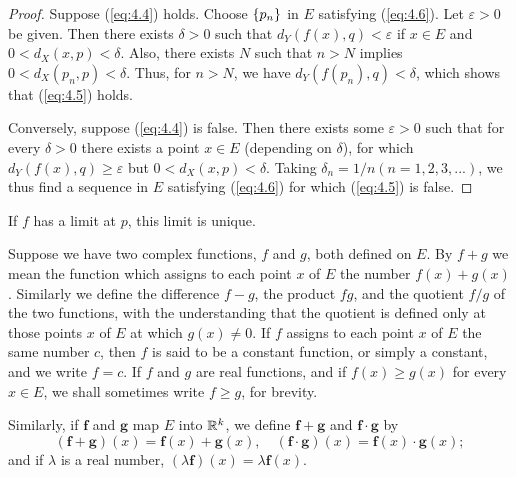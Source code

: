 \begin{proof}
    Suppose (\ref{eq:4.4}) holds. Choose $\protect\{p_n\}$ in $E$ satisfying (\ref{eq:4.6}). Let $\varepsilon > 0$ be given. Then there exists $\delta > 0$ such that $d_Y(f(x), q) < \varepsilon$ if $x \in E$ and $0 < d_X (x, p) < \delta$. Also, there exists $N$ such that $n > N$ implies $0 < d_X(p_n ,p) < \delta$. Thus, for $n > N$, we have $d_Y(f(p_n), q) < \delta$, which shows that (\ref{eq:4.5}) holds. 
    
    Conversely, suppose (\ref{eq:4.4}) is false. Then there exists some $\varepsilon > 0$ such that for every $\delta > 0$ there exists a point $x \in E$ (depending on $\delta$), for which $d_Y(f(x), q) \geq \varepsilon$ but $0 < d_X(x, p) < \delta$. Taking $\delta_n = 1/n (n = 1, 2, 3, ... )$, we thus find a sequence in $E$ satisfying (\ref{eq:4.6}) for which (\ref{eq:4.5}) is false.
\end{proof}

\begin{myCorollary}
    If $f$ has a limit at $p$, this limit is unique.
\end{myCorollary}

\begin{myDef}
    \label{myDef:4.3}
    Suppose we have two complex functions, $f$ and $g$, both defined on $E$. By $f + g$ we mean the function which assigns to each point $x$ of $E$ the number $f(x) + g(x)$. 
    Similarly we define the difference $f - g$, 
    the product $fg$, 
    and the quotient $f/g$ of the two functions, 
    with the understanding that the quotient is defined only at those points $x$ of $E$ at which $g(x) \neq 0$. 
    If $f$ assigns to each point $x$ of $E$ the same number $c$, 
    then $f$ is said to be a constant function, or simply a constant, 
    and we write $f = c$. 
    If $f$ and $g$ are real functions, and if $f(x) \geq g(x)$ for every $x \in E$, we shall sometimes write $f \geq g$, for brevity.

    Similarly, if $\mathbf{f}$ and $\mathbf{g}$ map $E$ into ${\protect\mathbb R}^{k}$, we define $\mathbf{f} + \mathbf{g}$ and $\mathbf{f} \cdot \mathbf{g}$ by
    \begin{equation*}
        (\mathbf{f} + \mathbf{g})(x) 
        = \mathbf{f}(x)  
        + \mathbf{g}(x) , \quad
        (\mathbf{f} \cdot \mathbf{g})(x) 
        = \mathbf{f}(x)  
        \cdot \mathbf{g}(x) ;        
    \end{equation*}
    and if $\lambda$ is a real number, $(\lambda \mathbf{f})(x) = \lambda \mathbf{f}(x)$.
\end{myDef}

